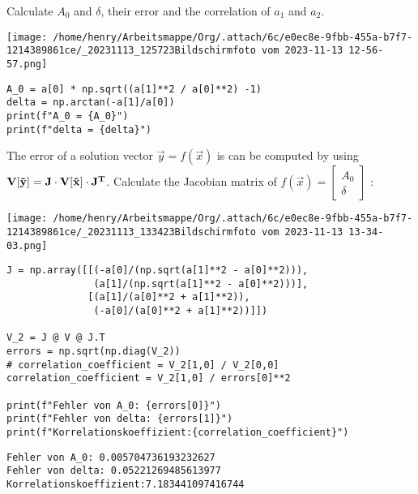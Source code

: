 \documentclass[11pt]{article}
\begin{document}
Calculate \(A_0\) and \(\delta\), their error and the correlation of \(a_1\) and \(a_2\).

\begin{center}
\texttt{[image: /home/henry/Arbeitsmappe/Org/.attach/6c/e0ec8e-9fbb-455a-b7f7-1214389861ce/\_20231113\_125723Bildschirmfoto vom 2023-11-13 12-56-57.png]}
\end{center}

\begin{verbatim}
A_0 = a[0] * np.sqrt((a[1]**2 / a[0]**2) -1)
delta = np.arctan(-a[1]/a[0])
print(f"A_0 = {A_0}")
print(f"delta = {delta}")
\end{verbatim}

The error of a solution vector \(\vec{y} = f(\vec{x})\) is can be computed by using \(\bf{V}[\vec{y}] = \bf{J} \cdot \bf{V}[\vec{x}] \cdot \bf{J}^{T}\).
Calculate the Jacobian matrix of \(f(\vec{x}) = \begin{bmatrix} A_0 \\ \delta \end{bmatrix}\) :

\begin{center}
\texttt{[image: /home/henry/Arbeitsmappe/Org/.attach/6c/e0ec8e-9fbb-455a-b7f7-1214389861ce/\_20231113\_133423Bildschirmfoto vom 2023-11-13 13-34-03.png]}
\end{center}

\begin{verbatim}
J = np.array([[(-a[0]/(np.sqrt(a[1]**2 - a[0]**2))),
               (a[1]/(np.sqrt(a[1]**2 - a[0]**2)))],
              [(a[1]/(a[0]**2 + a[1]**2)),
               (-a[0]/(a[0]**2 + a[1]**2))]])

V_2 = J @ V @ J.T
errors = np.sqrt(np.diag(V_2))
# correlation_coefficient = V_2[1,0] / V_2[0,0]
correlation_coefficient = V_2[1,0] / errors[0]**2

print(f"Fehler von A_0: {errors[0]}")
print(f"Fehler von delta: {errors[1]}")
print(f"Korrelationskoeffizient:{correlation_coefficient}")
\end{verbatim}

\begin{verbatim}
Fehler von A_0: 0.005704736193232627
Fehler von delta: 0.05221269485613977
Korrelationskoeffizient:7.183441097416744
\end{verbatim}
\end{document}
